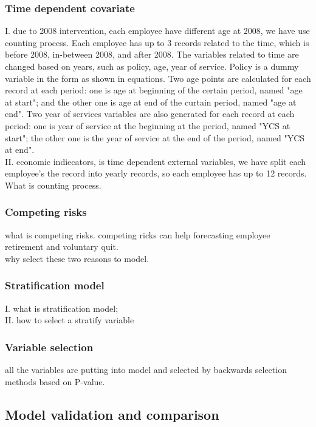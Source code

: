 \documentclass[12pt,letterpaper]{article}
\begin{document}
\subsubsection{Time dependent covariate}
    I. due to 2008 intervention, each employee have different age at 2008, we have use counting process. Each employee has up to 3 records related to the time, which is before 2008, in-between 2008, and after 2008. The variables related to time are changed based on years, such as policy, age, year of service. Policy is a dummy variable in the form as shown in equations. 
    Two age points are calculated for each record at each period: one is age at beginning of the certain period, named "age at start"; and the other one is age at end of the curtain period, named "age at end".
    Two year of services variables are also generated for each record at each period: one is year of service at the beginning at the period, named "YCS at start"; the other one is the year of service at the end of the period, named "YCS at end".\\
    II. economic indiecators, is time dependent external variables, we have split each employee's the record into yearly records, so each employee has up to 12 records.  
    What is counting process.   \\ 

\subsubsection{Competing risks}
  what is competing risks. competing ricks can help forecasting employee retirement and voluntary quit. \\
  why select these two reasons to model.\\
\subsubsection{Stratification model}
  I. what is stratification model;\\
  II. how to select a stratify variable\\
\subsubsection{Variable selection}
 all the variables are putting into model and selected by backwards selection methods based on P-value.\\
\subsection{Model validation and comparison}
\end{document}
